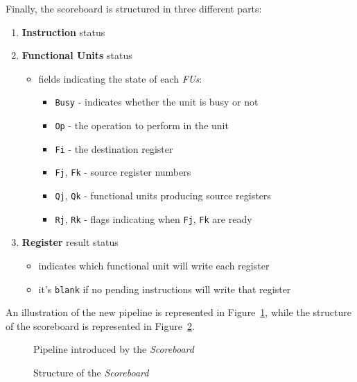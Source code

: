\documentclass[english]{article}
\begin{document}
Finally, the scoreboard is structured in three different parts:
\begin{enumerate}
  \item \textbf{Instruction} status
  \item \textbf{Functional Units} status
        \begin{itemize}
          \item fields indicating the state of each \textit{FUs}:
                \begin{itemize}
                  \item \texttt{Busy} - indicates whether the unit is busy or not
                  \item \texttt{Op} - the operation to perform in the unit
                  \item \texttt{Fi} - the destination register
                  \item \texttt{Fj}, \texttt{Fk} - source register numbers
                  \item \texttt{Qj}, \texttt{Qk} - functional units producing source registers
                  \item \texttt{Rj}, \texttt{Rk} - flags indicating when \texttt{Fj}, \texttt{Fk} are ready
                \end{itemize}
        \end{itemize}
  \item \textbf{Register} result status
        \begin{itemize}
          \item indicates which functional unit will write each register
          \item it's \texttt{blank} if no pending instructions will write that register
        \end{itemize}
\end{enumerate}

\bigskip
An illustration of the new pipeline is represented in Figure~\ref{fig:pipeline-of-scoreboard}, while the structure of the scoreboard is represented in Figure~\ref{fig:structure-of-scoreboard}.

\begin{figure}[htbp]
  \bigskip
  \centering
  \caption{Pipeline introduced by the \textit{Scoreboard}}
  \label{fig:pipeline-of-scoreboard}
  \bigskip
\end{figure}

\begin{figure}[htbp]
  \bigskip
  \centering
  \caption{Structure of the \textit{Scoreboard}}
  \label{fig:structure-of-scoreboard}
  \bigskip
\end{figure}
\end{document}
